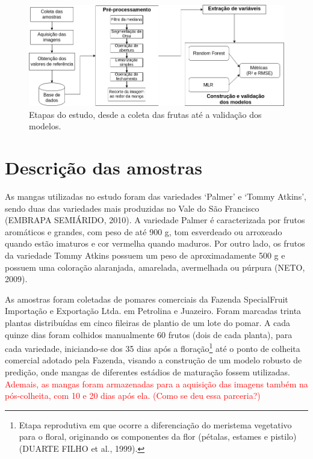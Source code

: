 \begin{figure}[H]
\centering
    \caption{Etapas do estudo, desde a coleta das frutas até a validação dos modelos.}\label{fig:diag}
    \includegraphics[scale=0.5]{img/diag.png}
\end{figure}

\section{Descrição das amostras}

As mangas utilizadas no estudo foram das variedades ‘Palmer’ e ‘Tommy Atkins’, sendo duas das variedades mais produzidas no Vale do São Francisco (EMBRAPA SEMIÁRIDO, 2010). A variedade Palmer é caracterizada por frutos aromáticos e grandes, com peso de até 900 g, tom esverdeado ou arroxeado quando estão imaturos e cor vermelha quando maduros. Por outro lado, os frutos da variedade Tommy Atkins possuem um peso de aproximadamente 500 g e possuem uma coloração alaranjada, amarelada, avermelhada ou púrpura (NETO, 2009). 

As amostras foram coletadas de pomares comerciais da Fazenda SpecialFruit Importação e Exportação Ltda. em Petrolina e Juazeiro. Foram marcadas trinta plantas distribuídas em cinco fileiras de plantio de um lote do pomar. A cada quinze dias foram colhidos manualmente 60 frutos (dois de cada planta), para cada variedade, iniciando-se dos 35 dias após a floração\footnote{\label{ftnote:floracao} Etapa reprodutiva em que ocorre a diferenciação do meristema vegetativo para o floral, originando os componentes da flor (pétalas, estames e pistilo) (DUARTE FILHO et al., 1999).} até o ponto de colheita comercial adotado pela Fazenda, visando a construção de um modelo robusto de predição, onde mangas de diferentes estádios de maturação fossem utilizadas. \textcolor{red}{Ademais, as mangas foram armazenadas para a aquisição das imagens também na pós-colheita, com 10 e 20 dias após ela. (Como se deu essa parceria?)}

